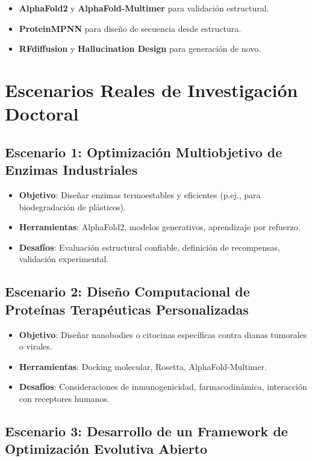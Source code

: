 \documentclass[12pt]{article}
\begin{document}
\begin{itemize}
    \item \textbf{AlphaFold2} y \textbf{AlphaFold-Multimer} para validación estructural.
    \item \textbf{ProteinMPNN} para diseño de secuencia desde estructura.
    \item \textbf{RFdiffusion} y \textbf{Hallucination Design} para generación de novo.
\end{itemize}

\section{Escenarios Reales de Investigación Doctoral}

\subsection{Escenario 1: Optimización Multiobjetivo de Enzimas Industriales}

\begin{itemize}
    \item \textbf{Objetivo}: Diseñar enzimas termoestables y eficientes (p.ej., para biodegradación de plásticos).
    \item \textbf{Herramientas}: AlphaFold2, modelos generativos, aprendizaje por refuerzo.
    \item \textbf{Desafíos}: Evaluación estructural confiable, definición de recompensas, validación experimental.
\end{itemize}

\subsection{Escenario 2: Diseño Computacional de Proteínas Terapéuticas Personalizadas}

\begin{itemize}
    \item \textbf{Objetivo}: Diseñar nanobodies o citocinas específicas contra dianas tumorales o virales.
    \item \textbf{Herramientas}: Docking molecular, Rosetta, AlphaFold-Multimer.
    \item \textbf{Desafíos}: Consideraciones de inmunogenicidad, farmacodinámica, interacción con receptores humanos.
\end{itemize}

\subsection{Escenario 3: Desarrollo de un Framework de Optimización Evolutiva Abierto}
\end{document}
